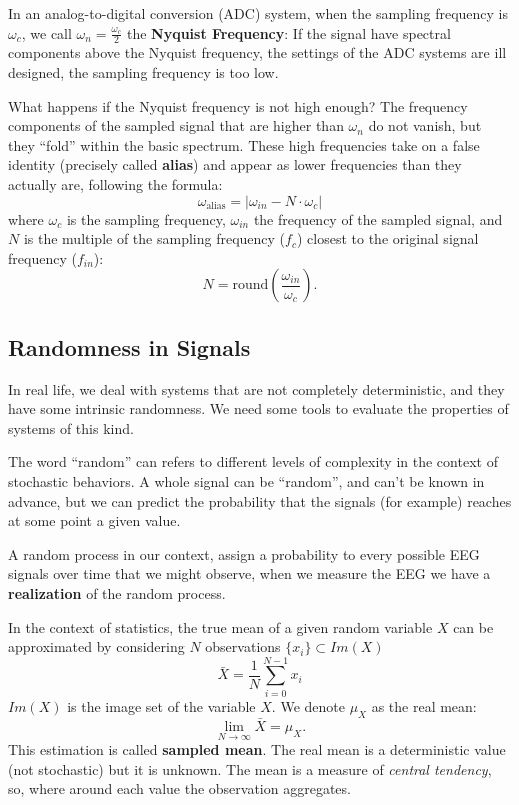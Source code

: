 \documentclass[10pt, letterpaper]{report}
\begin{document}
In an analog-to-digital conversion (ADC) system, when the sampling frequency is $\omega_c$, we call $\omega_n=\frac{\omega_c}{2}$ the \textbf{Nyquist Frequency}: If the signal have spectral components above the Nyquist frequency, the settings of the ADC systems are ill designed, the sampling frequency is too low.\bigskip 


What happens if the  Nyquist frequency is not high enough? The frequency components of the sampled signal that are higher than $\omega_n$ do not vanish, but they ``fold'' within the basic spectrum. These high frequencies take on a false identity (precisely called \textbf{alias}) and appear as lower frequencies than they actually are, following the formula:\begin{equation}
     \omega_{\text{alias}}=|\omega_{in}-N\cdot \omega_c|
\end{equation}
where $\omega_c$ is the sampling frequency, $\omega_{in}$ the frequency of the sampled signal, and $N$ is the multiple of the sampling frequency ($f_c$) closest to the original signal frequency ($f_{in}$):\begin{equation}
     N=\text{round}\left(\frac{\omega_{in}}{\omega_c}\right).
\end{equation}
\subsection{Randomness in Signals}
In real life, we deal with systems that are not completely deterministic, and they have some intrinsic randomness. We need some tools to evaluate the properties of systems of this kind.

The word ``random'' can refers to different levels of complexity in the context of stochastic behaviors. A whole signal can be ``random'', and can't be known in advance, but we can predict the probability that the signals (for example) reaches at some point a given value.\bigskip 

A random process in our context, assign a probability to every possible EEG signals over time that we might observe, when we measure the EEG we have a \textbf{realization} of the random process.\bigskip 

In the context of statistics, the true mean of a given random variable $X$ can be approximated by considering $N$ observations $\{x_i\}\subset Im(X)$\begin{equation}
     \bar X=\frac{1}{N}\sum_{i=0}^{N-1}x_i
\end{equation}
$Im(X)$ is the image set of the variable $X$.
We denote $\mu_X$ as the real mean:\begin{equation}
     \lim_{N\rightarrow \infty}\bar X=\mu_X.
\end{equation}
This estimation is called \textbf{sampled mean}. The real mean is a deterministic value (not stochastic) but it is unknown. The mean is a measure of \textit{central tendency}, so, where around each value the observation aggregates.\bigskip 
\end{document}
